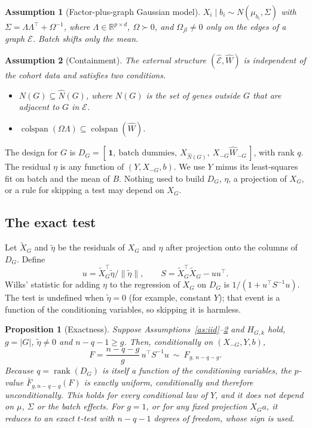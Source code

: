 \documentclass[10pt,twocolumn,letterpaper]{article}
\newtheorem{proposition}{Proposition}
\newtheorem{assumption}{Assumption}
\theoremstyle{remark}
\begin{document}
\begin{assumption}[Factor-plus-graph Gaussian model]\label{as:gauss}
$X_i\mid b_i\sim N(\mu_{b_i},\Sigma)$ with $\Sigma=\Lambda\Lambda^\top+\Omega^{-1}$, where $\Lambda\in\mathbb R^{p\times d}$, $\Omega\succ0$, and $\Omega_{jl}\neq0$ only on the edges of a graph $\mathcal E$. Batch shifts only the mean.
\end{assumption}

\begin{assumption}[Containment]\label{as:contain}
The external structure $(\hat{\mathcal E},\hat W)$ is independent of the cohort data and satisfies two conditions.
\begin{itemize}
  \item $N(G)\subseteq\hat N(G)$, where $N(G)$ is the set of genes outside $G$ that are adjacent to $G$ in $\mathcal E$.
  \item $\operatorname{colspan}(\Omega\Lambda)\subseteq\operatorname{colspan}(\hat W)$.
\end{itemize}
\end{assumption}

The design for $G$ is $D_G=[\,\mathbf 1,\ \text{batch dummies},\ X_{\hat N(G)},\ X_{-G}\hat W_{-G}\,]$, with rank $q$. The residual $\eta$ is any function of $(Y,X_{-G},b)$. We use $Y$ minus its least-squares fit on batch and the mean of $B$. Nothing used to build $D_G$, $\eta$, a projection of $X_G$, or a rule for skipping a test may depend on $X_G$.

\subsection{The exact test}

Let $\tilde X_G$ and $\tilde\eta$ be the residuals of $X_G$ and $\eta$ after projection onto the columns of $D_G$. Define
\[
u=\tilde X_G^\top\tilde\eta/\|\tilde\eta\|, \qquad S=\tilde X_G^\top\tilde X_G-uu^\top .
\]
Wilks' statistic for adding $\eta$ to the regression of $X_G$ on $D_G$ is $1/(1+u^\top S^{-1}u)$. The test is undefined when $\tilde\eta=0$ (for example, constant $Y$); that event is a function of the conditioning variables, so skipping it is harmless.

\begin{proposition}[Exactness]\label{prop:exact}
Suppose Assumptions~\ref{as:iid}--\ref{as:contain} and $H_{G,k}$ hold, $g=|G|$, $\tilde\eta\neq0$ and $n-q-1\ge g$. Then, conditionally on $(X_{-G},Y,b)$,
\[
F=\frac{n-q-g}{g}\,u^\top S^{-1}u\ \sim\ F_{g,\,n-q-g}.
\]
Because $q=\operatorname{rank}(D_G)$ is itself a function of the conditioning variables, the $p$-value $\bar F_{g,n-q-g}(F)$ is exactly uniform, conditionally and therefore unconditionally. This holds for every conditional law of $Y$, and it does not depend on $\mu$, $\Sigma$ or the batch effects. For $g=1$, or for any fixed projection $X_Ga$, it reduces to an exact $t$-test with $n-q-1$ degrees of freedom, whose sign is used.
\end{proposition}
\end{document}
